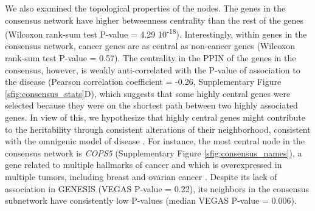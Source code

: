 \documentclass[twocolumn, 11pt, draft]{article}
\begin{document}
We also examined the topological properties of the nodes. The genes in the consensus network have higher betweenness centrality than the rest of the genes (Wilcoxon rank-sum test P-value = 4.29 \texttimes{} 10\textsuperscript{-18}). Interestingly, within genes in the consensus network, cancer genes are as central as non-cancer genes (Wilcoxon rank-sum test P-value = 0.57). The centrality in the PPIN of the genes in the consensus, however, is weakly anti-correlated with the P-value of association to the disease (Pearson correlation coefficient = -0.26, Supplementary Figure \ref{sfig:consensus_stats}D), which suggests that some highly central genes were selected because they were on the shortest path between two highly associated genes. In view of this, we hypothesize that highly central genes might contribute to the heritability through consistent alterations of their neighborhood, consistent with the omnigenic model of disease \cite{boyle_expanded_2017}. For instance, the most central node in the consensus network is \emph{COPS5} (Supplementary Figure \ref{sfig:consensus_names}), a gene related to multiple hallmarks of cancer and which is overexpressed in multiple tumors, including breast and ovarian cancer \cite{liu_jab1_cops5_2018}. Despite its lack of association in GENESIS (VEGAS P-value = 0.22), its neighbors in the consensus subnetwork have consistently low P-values (median VEGAS P-value = 0.006).

\end{document}
